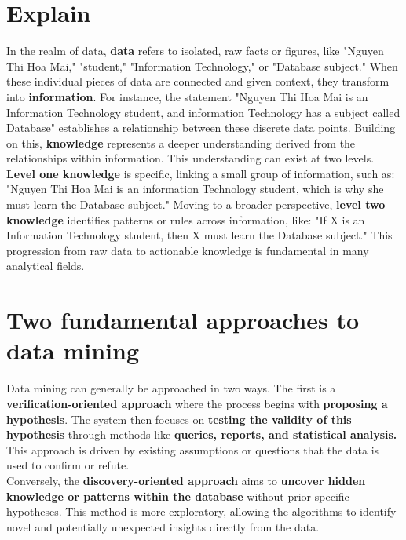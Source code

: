 \section{Explain}
In the realm of data, \textbf{data} refers to isolated, raw facts or figures, like "Nguyen Thi Hoa Mai," "student," "Information Technology," or "Database subject." When these individual pieces of data are connected and given context, they transform into \textbf{information}. For instance, the statement "Nguyen Thi Hoa Mai is an Information Technology student, and information Technology has a subject called Database" establishes a relationship between these discrete data points. Building on this, \textbf{knowledge} represents a deeper understanding derived from the relationships within information. This understanding can exist at two levels. \textbf{Level one knowledge} is specific, linking a small group of information, such as: "Nguyen Thi Hoa Mai is an information Technology student, which is why she must learn the Database subject." Moving to a broader perspective, \textbf{level two knowledge} identifies patterns or rules across information, like: "If X is an Information Technology student, then X must learn the Database subject." This progression from raw data to actionable knowledge is fundamental in many analytical fields.
\section{Two fundamental approaches to data mining}
Data mining can generally be approached in two ways. The first is a \textbf{verification-oriented approach} where the process begins with \textbf{proposing a hypothesis}. The system then focuses on \textbf{testing the validity of this hypothesis} through methods like \textbf{queries, reports, and statistical analysis.} This approach is driven by existing assumptions or questions that the data is used to confirm or refute.\\
Conversely, the \textbf{discovery-oriented approach} aims to \textbf{uncover hidden knowledge or patterns within the database} without prior specific hypotheses. This method is more exploratory, allowing the algorithms to identify novel and potentially unexpected insights directly from the data.
